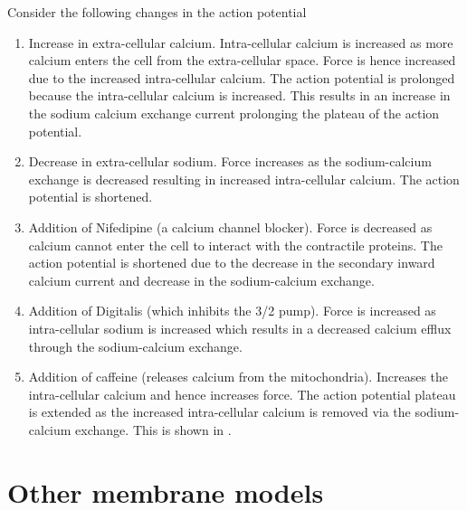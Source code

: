 Consider the following changes in the action potential
\begin{enumerate}
\item Increase in extra-cellular calcium. Intra-cellular calcium is increased
  as more calcium enters the cell from the extra-cellular space. Force is
  hence increased due to the increased intra-cellular calcium. The action
  potential is prolonged because the intra-cellular calcium is increased. This
  results in an increase in the sodium calcium exchange current prolonging the
  plateau of the action potential.
\item Decrease in extra-cellular sodium. Force increases as the sodium-calcium
  exchange is decreased resulting in increased intra-cellular calcium. The
  action potential is shortened.
\item Addition of Nifedipine (a calcium channel blocker). Force is decreased
  as calcium cannot enter the cell to interact with the contractile
  proteins. The action potential is shortened due to the decrease in the
  secondary inward calcium current and decrease in the sodium-calcium
  exchange.
\item Addition of Digitalis (which inhibits the 3/2
  pump). Force is increased as intra-cellular sodium is increased which results
  in a decreased calcium efflux through the sodium-calcium exchange.
\item Addition of caffeine (releases calcium from the mitochondria). Increases
  the intra-cellular calcium and hence increases force. The action potential
  plateau is extended as the increased intra-cellular calcium is removed via
  the sodium-calcium exchange. This is shown in .
\end{enumerate}


\section{Other membrane models}
\label{sec:biophysical_models_of_cardiac_cells}
